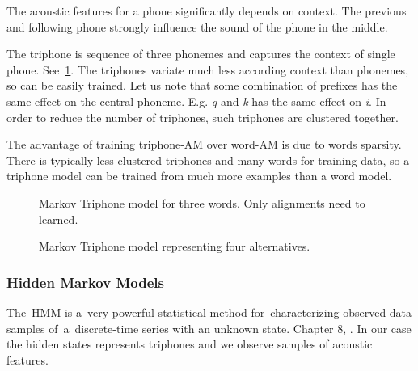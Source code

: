 {The acoustic features for a phone significantly depends on context.
The previous and following phone strongly influence the sound of the phone in the middle.

The triphone is sequence of three phonemes and captures the context of single phone.
See~\ref{fig:hmm_words}.
The triphones variate much less according context than phonemes, so can be easily trained.
Let us note that some combination of prefixes has the same effect on the central phoneme.
E.g. {\it q}\/ and {\it k} has the same effect on {\it i}. %
In order to reduce the number of triphones, such triphones are clustered together.

The advantage of training triphone-\ac{AM} over word-\ac{AM} 
is due to words sparsity. 
There is typically less clustered triphones and many words for training data,
so a triphone model can be trained from much more examples than a word model. 


\begin{figure}[!htp]
    \begin{center}
    
    \caption{Markov Triphone model for three words. Only alignments need to learned.}
    \label{fig:hmm_words} 
    \end{center}
\end{figure}


\begin{figure}[!htp]
    \begin{center}
    
    \caption{Markov Triphone model representing four alternatives.}
    \label{fig:hmm_alt} 
    \end{center}
\end{figure}


%     
%     

\subsubsection*{Hidden Markov Models}
The~\ac{HMM} is a~very powerful statistical method for~characterizing observed data samples
of~a~discrete-time series with an unknown state. Chapter 8, \cite{huang2001spoken}.
In our case the hidden states represents triphones and we observe samples of  acoustic features.

}
